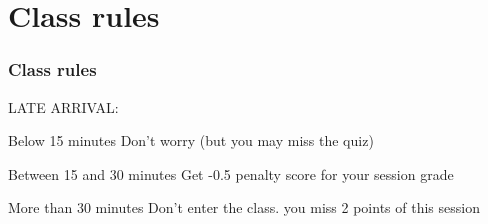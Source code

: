 \documentclass[aspectratio=169,15pt]{beamer}
\begin{document}
\section{Class rules}
\begin{frame}
    \frametitle{Class rules}

    LATE ARRIVAL:
    {
    \begin{block}{Below 15 minutes}
        Don’t worry (but you may miss the quiz)
    \end{block}
    }
    {
    \begin{block}{Between 15 and 30 minutes}
        Get \alert{-0.5} penalty score for your session grade
    \end{block}
    }
    \begin{alertblock}{More than 30 minutes}
        Don’t enter the class. you miss \alert{2} points of this session
    \end{alertblock}

\end{frame}
\end{document}
